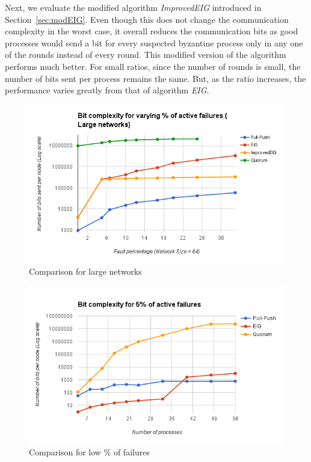 Next, we evaluate the modified algorithm \textit{ImprovedEIG} introduced in
Section~\ref{sec:modEIG}. Even though this does not change the communication
complexity in the worst case, it overall reduces the communication bits as good
processes would send a bit for every suspected byzantine process only in any
one of the rounds instead of every round. This modified version of the
algorithm performs much better. For small ratios, since the number of rounds is
small, the number of bits sent per process remains the same. But, as the ratio
increases, the performance varies greatly from that of algorithm \textit{EIG}.
\begin{figure}[ht] \centering 
    \vspace{-2mm}
            \includegraphics[scale=0.4]{LargeNetBit} 
            \caption{Comparison for large networks} \label{fig:comp}
    \vspace{-4mm}
             \end{figure}


\begin{figure}[ht] \centering
    \vspace{-2mm}
    \includegraphics[scale=0.4]{Fault5}
     \caption{Comparison for low \% of failures}
    \label{fig:fault5}  
    \vspace{-6mm}
\end{figure}

